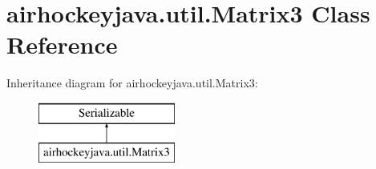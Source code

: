 \hypertarget{classairhockeyjava_1_1util_1_1_matrix3}{}\section{airhockeyjava.\+util.\+Matrix3 Class Reference}
\label{classairhockeyjava_1_1util_1_1_matrix3}
Inheritance diagram for airhockeyjava.\+util.\+Matrix3\+:\begin{figure}[H]
\begin{center}
\leavevmode
\includegraphics[height=2.000000cm]{classairhockeyjava_1_1util_1_1_matrix3}
\end{center}
\end{figure}

